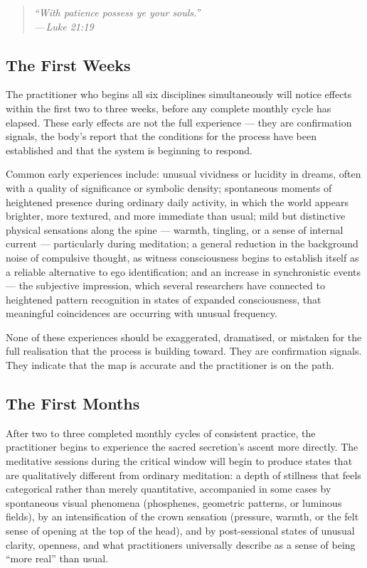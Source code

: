 \documentclass[12pt, a4paper]{article}
\newcommand{\epigraph}[2]{%
  \begin{quote}
    \itshape ``#1''\\[0.3em]
    \normalfont\small\hfill ---\,#2
  \end{quote}
}
\begin{document}
\epigraph{With patience possess ye your souls.}{Luke 21:19}

\subsection{The First Weeks}

The practitioner who begins all six disciplines simultaneously will notice
effects within the first two to three weeks, before any complete monthly cycle
has elapsed. These early effects are not the full experience — they are
confirmation signals, the body's report that the conditions for the process
have been established and that the system is beginning to respond.

Common early experiences include: unusual vividness or lucidity in dreams,
often with a quality of significance or symbolic density; spontaneous moments
of heightened presence during ordinary daily activity, in which the world
appears brighter, more textured, and more immediate than usual; mild but
distinctive physical sensations along the spine — warmth, tingling, or a
sense of internal current — particularly during meditation; a general
reduction in the background noise of compulsive thought, as witness
consciousness begins to establish itself as a reliable alternative to ego
identification; and an increase in synchronistic events — the subjective
impression, which several researchers have connected to heightened pattern
recognition in states of expanded consciousness, that meaningful coincidences
are occurring with unusual frequency.

None of these experiences should be exaggerated, dramatised, or mistaken for
the full realisation that the process is building toward. They are
confirmation signals. They indicate that the map is accurate and the
practitioner is on the path.

\subsection{The First Months}

After two to three completed monthly cycles of consistent practice, the
practitioner begins to experience the sacred secretion's ascent more directly.
The meditative sessions during the critical window will begin to produce states
that are qualitatively different from ordinary meditation: a depth of stillness
that feels categorical rather than merely quantitative, accompanied in some
cases by spontaneous visual phenomena (phosphenes, geometric patterns, or
luminous fields), by an intensification of the crown sensation (pressure,
warmth, or the felt sense of opening at the top of the head), and by
post-sessional states of unusual clarity, openness, and what practitioners
universally describe as a sense of being ``more real'' than usual.
\end{document}
